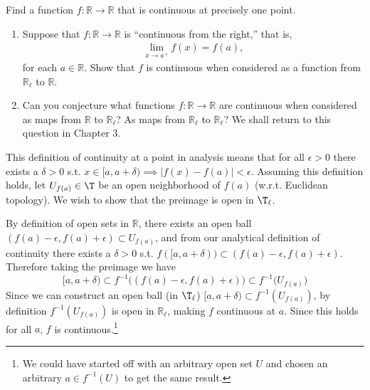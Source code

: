   \begin{exercise}[Munkres 18.6]
    Find a function $f : \mathbb{R} \to \mathbb{R}$ that is continuous at precisely one point.
  \end{exercise}

  \begin{exercise}[Munkres 18.7]
    \begin{enumerate}
      \item Suppose that $f : \mathbb{R} \to \mathbb{R}$ is ``continuous from the right,'' that is,
      \begin{align*}
        \lim_{x \to a^+} f(x) = f(a),
      \end{align*}
      for each $a \in \mathbb{R}$. Show that $f$ is continuous when considered as a function from $\mathbb{R}_\ell$ to $\mathbb{R}$.
      \item Can you conjecture what functions $f : \mathbb{R} \to \mathbb{R}$ are continuous when considered as maps from $\mathbb{R}$ to $\mathbb{R}_\ell$? As maps from $\mathbb{R}_\ell$ to $\mathbb{R}_\ell$? We shall return to this question in Chapter 3.
    \end{enumerate}
  \end{exercise}
  \begin{solution}
    This definition of continuity at a point in analysis means that for all $\epsilon > 0$ there exists a $\delta > 0$ s.t. $x \in [a, a + \delta) \implies |f(x) - f(a)| < \epsilon$. Assuming this definition holds, let $U_{f(a)} \in \T$ be an open neighborhood of $f(a)$ (w.r.t. Euclidean topology). We wish to show that the preimage is open in $\T_\ell$. 

    By definition of open sets in $\mathbb{R}$, there exists an open ball $(f(a) - \epsilon, f(a) + \epsilon) \subset U_{f(a)}$, and from our analytical definition of continuity there exists a $\delta > 0$ s.t. $f([a, a + \delta)) \subset (f(a) - \epsilon, f(a) + \epsilon)$. Therefore taking the preimage we have 
    \begin{equation}
      [a, a+\delta) \subset f^{-1} \big( (f(a) - \epsilon, f(a) + \epsilon ) \big) \subset f^{-1} \big( U_{f(a)} \big)
    \end{equation}
    Since we can construct an open ball (in $\T_\ell$) $[a, a + \delta) \subset f^{-1} (U_{f(a)})$, by definition $f^{-1} (U_{f(a)})$ is open in $\mathbb{R}_\ell$, making $f$ continuous at $a$. Since this holds for all $a$, $f$ is continuous.\footnote{We could have started off with an arbitrary open set $U$ and chosen an arbitrary $a \in f^{-1} (U)$ to get the same result.} 
  \end{solution}

